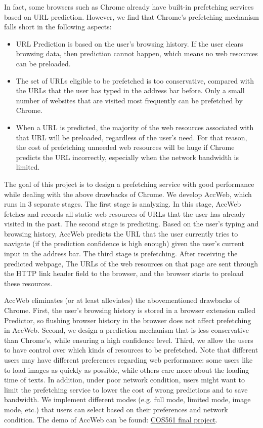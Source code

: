 In fact, some browsers such as Chrome already have built-in prefetching services based on URL prediction. However, we find that Chrome's prefetching mechanism falls short in the following aspects:
\begin{itemize}
	\item URL Prediction is based on the user's browsing history. If the user clears browsing data, then prediction cannot happen, which means no web resources can be preloaded.
	\item The set of URLs eligible to be prefetched is too conservative, compared with the URLs that the user has typed in the address bar before. Only a small number of websites that are visited most frequently can be prefetched by Chrome.
	\item When a URL is predicted, the majority of the web resources associated with that URL will be preloaded, regardless of the user's need. For that reason, the cost of prefetching unneeded web resources will be huge if Chrome predicts the URL incorrectly, especially when the network bandwidth is limited.
\end{itemize}

The goal of this project is to design a prefetching service with good performance while dealing with the above drawbacks of Chrome. We develop AccWeb, which runs in 3 separate stages. The first stage is analyzing. In this stage, AccWeb fetches and records all static web resources of URLs that the user has already visited in the past. The second stage is predicting. Based on the user's typing and browsing history, AccWeb predicts the URL that the user currently tries to navigate (if the prediction confidence is high enough) given the user's current input in the address bar. The third stage is prefetching. After receiving the predicted webpage, The URLs of the web resources on that page are sent through the HTTP link header field to the browser, and the browser starts to preload these resources.

AccWeb eliminates (or at least alleviates) the abovementioned drawbacks of Chrome. First, the user's browsing history is stored in a browser extension called Predictor, so flushing browser history in the browser does not affect prefetching in AccWeb. Second, we design a prediction mechanism that is less conservative than Chrome's, while ensuring a high confidence level. Third, we allow the users to have control over which kinds of resources to be prefetched. Note that different users may have different preferences regarding web performance: some users like to load images as quickly as possible, while others care more about the loading time of texts. In addition, under poor network condition, users might want to limit the prefetching service to lower the cost of wrong predictions and to save bandwidth. We implement different modes (e.g. full mode, limited mode, image mode, etc.) that users can select based on their preferences and network condition. The demo of AccWeb can be found: \href{https://github.com/caiqizhe/COS561_final_project}{COS561 final project}.


